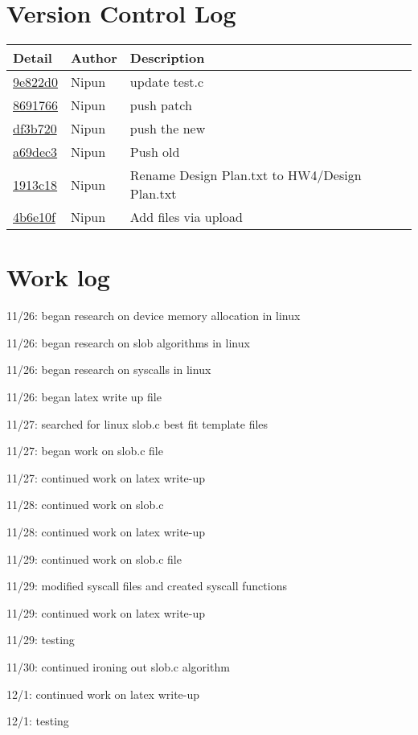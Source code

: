 \documentclass[onecolumn, draftclsnofoot,10pt, compsoc]{IEEEtran}
\begin{document}
\section{Version Control Log}

\begin{tabular}{l l p{1.5in}}\textbf{Detail} & \textbf{Author} & \textbf{Description}\\\hline
	\href{https://github.com/NipunBathini/CS444/commit/9e822d032d044a83b1899a8fbf351415b689586d}{9e822d0} & Nipun & update test.c\\\hline
	\href{https://github.com/NipunBathini/CS444/commit/8691766dfe165c92fdc9c95d0d2ec4b9b948b3cd}{8691766} & Nipun & push patch\\\hline
	\href{https://github.com/NipunBathini/CS444/commit/df3b720ac50d7d541769061abdde739b3ed2e78d}{df3b720} & Nipun & push the new\\\hline
	\href{https://github.com/NipunBathini/CS444/commit/a69dec36b146a5b0567144f05d2407a4170d5d50}{a69dec3} & Nipun & Push old\\\hline
	\href{https://github.com/NipunBathini/CS444/commit/1913c18c7f6603c2633e8dd89c2664629f1534f6}{1913c18} & Nipun & Rename Design Plan.txt to HW4/Design Plan.txt\\\hline
	\href{https://github.com/NipunBathini/CS444/commit/4b6e10fb7e0f7a8ba3ca91a6eb70342902a2420d}{4b6e10f} & Nipun & Add files via upload\\\hline
	\end{tabular}

\section{Work log}

	11/26: began research on device memory allocation in linux
	
	11/26: began research on slob algorithms in linux
	
	11/26:  began research on syscalls in linux
	
	11/26: began latex write up file
	
	11/27: searched for linux slob.c best fit template files
	
	11/27: began work on slob.c file
	
	11/27: continued work on latex write-up
	
	11/28: continued work on slob.c
	
	11/28: continued work on latex write-up
	
	11/29: continued work on slob.c file
	
	11/29: modified syscall files and created syscall functions
	
	11/29: continued work on latex write-up
	
	11/29: testing
	
	11/30: continued ironing out slob.c algorithm
	
	12/1: continued work on latex write-up
	
	12/1: testing
	
\end{document}
